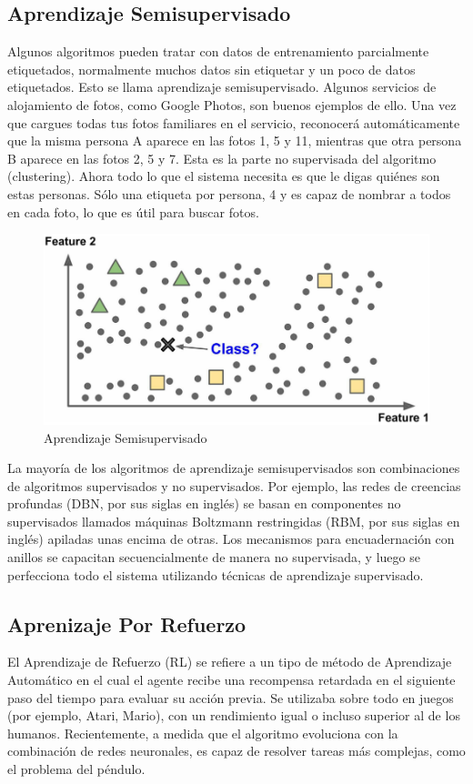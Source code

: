 \subsection{Aprendizaje Semisupervisado}

Algunos algoritmos pueden tratar con datos de entrenamiento parcialmente etiquetados, normalmente muchos datos sin etiquetar y un poco de datos etiquetados. Esto se llama aprendizaje semisupervisado. Algunos servicios de alojamiento de fotos, como Google Photos, son buenos ejemplos de ello. Una vez que cargues todas tus fotos familiares en el servicio, reconocerá automáticamente que la misma persona A aparece en las fotos 1, 5 y 11, mientras que otra persona B aparece en las fotos 2, 5 y 7. Esta es la parte no supervisada del algoritmo (clustering). Ahora todo lo que el sistema necesita es que le digas quiénes son estas personas. Sólo una etiqueta por persona, 4 y es capaz de nombrar a todos en cada foto, lo que es útil para buscar fotos.

\begin{figure}[ht]
	\centering
	\includegraphics[width=0.30\linewidth]{figuras/semisupervised.png}
	\caption{Aprendizaje Semisupervisado}
	\label{ASS}
\end{figure}

La mayoría de los algoritmos de aprendizaje semisupervisados son combinaciones de algoritmos supervisados y no supervisados. Por ejemplo, las redes de creencias profundas (DBN, por sus siglas en inglés) se basan en componentes no supervisados llamados máquinas Boltzmann restringidas (RBM, por sus siglas en inglés) apiladas unas encima de otras. Los mecanismos para encuadernación con anillos se capacitan secuencialmente de manera no supervisada, y luego se perfecciona todo el sistema utilizando técnicas de aprendizaje supervisado.


\subsection{Aprenizaje Por Refuerzo}
El Aprendizaje de Refuerzo (RL) se refiere a un tipo de método de Aprendizaje Automático en el cual el agente recibe una recompensa retardada en el siguiente paso del tiempo para evaluar su acción previa. Se utilizaba sobre todo en juegos (por ejemplo, Atari, Mario), con un rendimiento igual o incluso superior al de los humanos. Recientemente, a medida que el algoritmo evoluciona con la combinación de redes neuronales, es capaz de resolver tareas más complejas, como el problema del péndulo.

